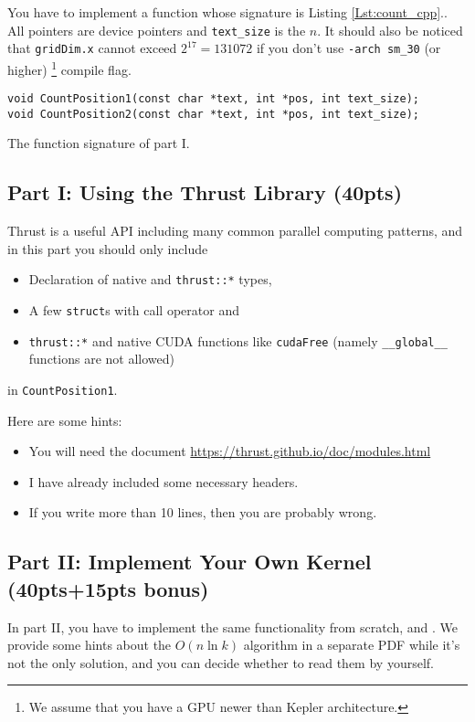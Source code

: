\documentclass[12pt,a4paper]{article}
\renewcommand{\_}{\textscale{.5}{\textunderscore}}
\newcommand{\lstref}[1]{Listing \ref{Lst:#1}.}
\begin{document}
You have to implement a function whose signature is \lstref{count_cpp}.
All pointers are device pointers and \verb+text_size+ is the $n$.
It should also be noticed that \verb+gridDim.x+ cannot exceed $2^{17}=131072$
if you don't use \verb|-arch sm_30| (or higher)
\footnote{We assume that you have a GPU newer than Kepler architecture.} compile flag.

\begin{listing}[ht]
\begin{verbatim}
void CountPosition1(const char *text, int *pos, int text_size);
void CountPosition2(const char *text, int *pos, int text_size);
\end{verbatim}
\caption{The function signature of part I.}\label{Lst:count_cpp}
\end{listing}

\subsection{Part I: Using the Thrust Library (40pts)}\label{thrust}

Thrust is a useful API including many common parallel computing patterns,
and in this part you should only include
\begin{itemize}
\item Declaration of native and \verb+thrust::*+ types,
\item A few \verb+struct+s with call operator and
\item \verb+thrust::*+ and native CUDA functions like \verb+cudaFree+
      (namely \verb+__global__+ functions are not allowed)
\end{itemize}
in \verb+CountPosition1+.

Here are some hints:
\begin{itemize}
\item You will need the document \url{https://thrust.github.io/doc/modules.html}
\item I have already included some necessary headers.
\item If you write more than 10 lines, then you are probably wrong.
\end{itemize}

\subsection{Part II: Implement Your Own Kernel (40pts+15pts bonus)}

In part II, you have to implement the same functionality from scratch,
and {\color{red}{no external API and library is allowed}}.
We provide some hints about the $O(n\ln k)$ algorithm in a separate PDF
while it's not the only solution,
and you can decide whether to read them by yourself.
\end{document}
